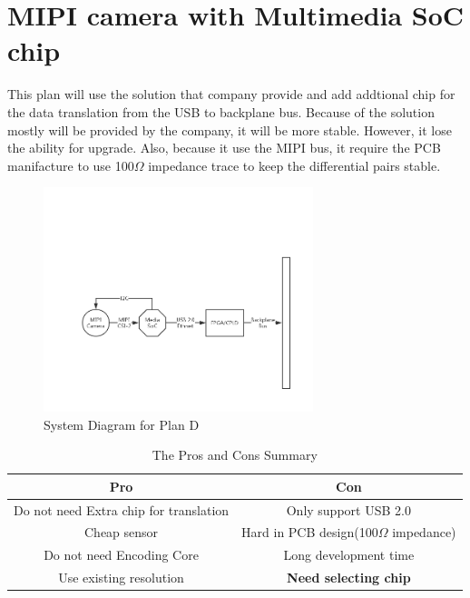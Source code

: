 \documentclass[12pt,article]{memoir}
\begin{document}
\section{MIPI camera with Multimedia SoC chip}
This plan will use the solution that company provide and add addtional chip for the data translation from the USB to backplane bus. Because of the solution mostly will be provided by the company, it will be more stable. However, it lose the ability for upgrade. Also, because it use the MIPI bus, it require the PCB manifacture to use 100$\Omega$ impedance trace to keep the differential pairs stable.
\begin{figure}[htp]
\begin{center}
\includegraphics[width=0.7\textwidth]{DR00002_Plan4.png}
 \caption{System Diagram for Plan D}	
\end{center}
\end{figure}
\begin{table}[H]
	\centering
		\begin{tabu}{c | c }
		Pro & Con \\ \hline
		Do not need Extra chip for translation & Only support USB 2.0\\
		Cheap sensor & Hard in PCB design(100$\Omega$ impedance) \\
		Do not need Encoding Core & Long development time \\
		Use existing resolution  & \textbf{Need selecting chip} \\
		\end{tabu}
	\caption{The Pros and Cons Summary}
\end{table}
\newpage
\end{document}
